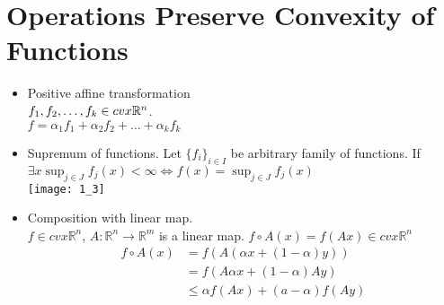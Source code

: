 \documentclass[11pt]{book} %
\def\R{\mathbb{R}}
\begin{document}
\section{Operations Preserve Convexity of Functions}
\begin{itemize}
\item Positive affine transformation \\
$f_1,f_2,\ldots,f_k \in \space cvx \R^n$.\\
$f = \alpha_1 f_1 + \alpha_2 f_2 + \ldots + \alpha_k f_k$
\item Supremum of functions. Let $\{ f_i \}_{i \in I}$ be arbitrary family of functions. If $\exists x \sup_{j \in J} f_j(x) < \infty \Leftrightarrow f(x) = \sup_{j \in J} f_j(x) $\\
\texttt{[image: 1\_3]}
\item Composition with linear map.\\
$f \in cvx \R^n$, $A:\R^n \to \R^m$ is a linear map.
$f \circ A (x) = f(Ax) \in cvx \R^n$\\
\begin{align*}
f \circ A (x) & = f(A(\alpha x + (1-\alpha) y)) \\
& = f(A \alpha x + (1-\alpha) A y) \\
& \le \alpha f(Ax) + (a - \alpha) f(Ay)
\end{align*}
\end{itemize}
\end{document}
